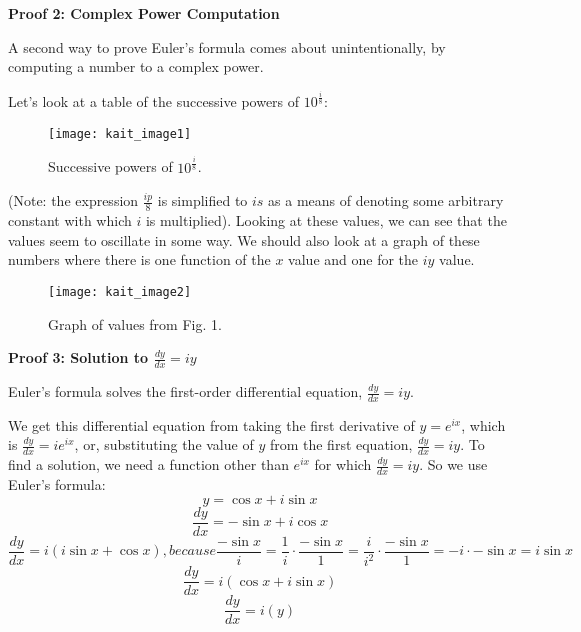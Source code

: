 \noindent
\textbf{Proof 2: Complex Power Computation}

A second way to prove Euler’s formula comes about unintentionally, by computing a number to a complex power.

Let’s look at a table of the successive powers of $10^{\frac{i}{8}}$:


\renewcommand{\thefigure}{1}
\begin{figure}[h]
  \begin{center}
    \texttt{[image: kait\_image1]}
  \end{center}
  \caption{Successive powers of $10^{\frac{i}{8}}$.}
  \label{fig:1}
\end{figure}

(Note: the expression $\frac{ip}{8}$ is simplified to $is$ as a means of denoting some arbitrary constant with which $i$ is multiplied). Looking at these values, we can see that the values seem to oscillate in some way. We should also look at a graph of these numbers where there is one function of the $x$ value and one for the $iy$ value.

\renewcommand{\thefigure}{2}
\begin{figure}[h]
  \begin{center}
    \texttt{[image: kait\_image2]}
  \end{center}
  \caption{Graph of values from Fig. 1.}
  \label{fig:2}
\end{figure}

\noindent
\textbf{Proof 3: Solution to $\frac{dy}{dx}=iy$}

Euler’s formula solves the first-order differential equation, $\frac{dy}{dx}=iy$.

We get this differential equation from taking the first derivative of $y=e^{ix}$, which is $\frac{dy}{dx}=ie^{ix}$, or, substituting the value of $y$ from the first equation, $\frac{dy}{dx}=iy$. To find a solution, we need a function other than $e^{ix}$ for which $\frac{dy}{dx}=iy$. So we use Euler’s formula:
\[y=\cos x + i\sin x\]
\[\frac{dy}{dx}= -\sin x + i\cos x\]
\[\frac{dy}{dx}= i(i\sin x + \cos x), because \frac{-\sin x}{i}=\frac{1}{i} \cdot \frac{-\sin x}{1} = \frac{i}{i^2} \cdot \frac{-\sin x}{1} = -i \cdot -\sin x = i\sin x\]
\[\frac{dy}{dx} = i(\cos x + i\sin x)\]
\[\frac{dy}{dx} = i(y)\]

